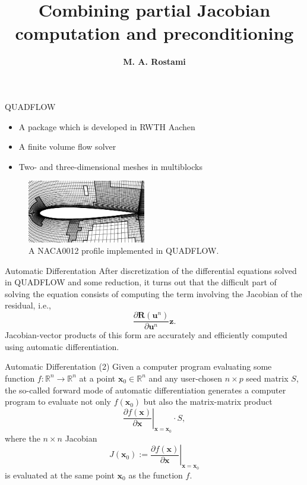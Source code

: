 \documentclass{beamer}
\title[]
{Combining partial Jacobian computation and preconditioning}
\author[\textbf{Rostami}]{{\bf M. A. Rostami}}
\institute[FSU Jena]{
  Chair of Advanced Computing\\
  Friedrich Schiller University Jena, Germany\\[1ex]
  \texttt{a.rostami@uni-jena.de}
}
\newcommand{\vek}[1]{{\ensuremath{\mathbf #1}}}
\newcommand{\R}{\ensuremath{\field{R}}}
\newcommand{\field}[1]{\mathbb{#1}}
\begin{document}
\begin{frame}[plain]
  \titlepage
\end{frame}

\begin{frame}{QUADFLOW}
\begin{itemize}
\item A package which is developed in RWTH Aachen
\item A finite volume flow solver
\item Two- and three-dimensional meshes in multiblocks
\end{itemize}
\begin{figure}[h]
\centering
\includegraphics[width=0.46\textwidth]{profile}
\caption{A NACA0012 profile implemented in
QUADFLOW.}
\label{f:profile}
\end{figure}
\end{frame}

\begin{frame}{Automatic Differentation}
After discretization of the differential equations solved in 
QUADFLOW and some reduction, it turns out that the
difficult part of solving the equation consists of computing the term involving the
Jacobian of the residual, i.e.,
\begin{equation*}
\frac{\partial \vek{R}(\vek{u}^n)}{\partial \vek{u}^n} \vek{z}.
\end{equation*}
Jacobian-vector products of this form are accurately and efficiently computed using
automatic differentiation.
\end{frame}

\begin{frame}{Automatic Differentation (2)}
Given a computer program evaluating some function $f: \R^n \rightarrow
\R^n$ at a point $\vek{x}_0\in \R^n$ and any user-chosen $n \times p$ seed matrix $S$,
the so-called forward mode of automatic differentiation generates a computer program to
evaluate not only $f(\vek{x}_0)$ but also the matrix-matrix product
$$
\left.\frac{\partial f(\vek{x})}{\partial \vek{x}}\right|_{\vek{x}=\vek{x}_0} \cdot S,
$$
where the $n \times n$ Jacobian
$$
J(\vek{x}_0) := \left.\frac{\partial f(\vek{x})}{\partial \vek{x}}\right|_{\vek{x}=\vek{x}_0}
$$
is evaluated at the same point $\vek{x}_0$ as the function $f$.
\end{frame}
\end{document}
